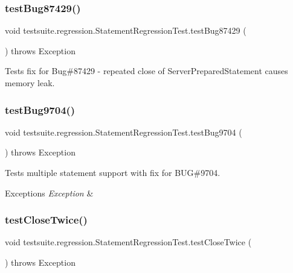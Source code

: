 \subsubsection{\texorpdfstring{test\+Bug87429()}{testBug87429()}}
{\footnotesize\ttfamily void testsuite.\+regression.\+Statement\+Regression\+Test.\+test\+Bug87429 (\begin{DoxyParamCaption}{ }\end{DoxyParamCaption}) throws Exception}

Tests fix for Bug\#87429 -\/ repeated close of Server\+Prepared\+Statement causes memory leak. \mbox{\label{classtestsuite_1_1regression_1_1_statement_regression_test_a5da35a1c85dea6e6eac135094859b6d2}} 
\subsubsection{\texorpdfstring{test\+Bug9704()}{testBug9704()}}
{\footnotesize\ttfamily void testsuite.\+regression.\+Statement\+Regression\+Test.\+test\+Bug9704 (\begin{DoxyParamCaption}{ }\end{DoxyParamCaption}) throws Exception}

Tests multiple statement support with fix for B\+UG\#9704.


\begin{DoxyExceptions}{Exceptions}
{\em Exception} & \\
\hline
\end{DoxyExceptions}
\mbox{\label{classtestsuite_1_1regression_1_1_statement_regression_test_a4ee424820f3c751235f0082c64575f6a}} 
\subsubsection{\texorpdfstring{test\+Close\+Twice()}{testCloseTwice()}}
{\footnotesize\ttfamily void testsuite.\+regression.\+Statement\+Regression\+Test.\+test\+Close\+Twice (\begin{DoxyParamCaption}{ }\end{DoxyParamCaption}) throws Exception}

